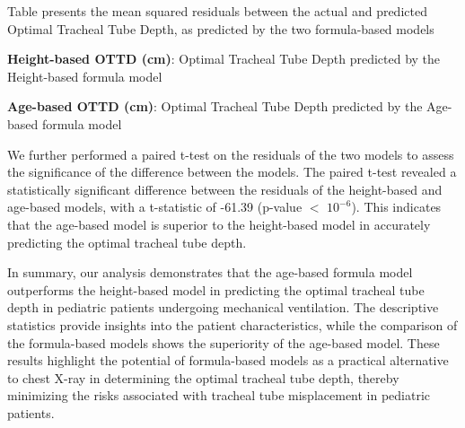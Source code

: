 \documentclass[11pt]{article}
\begin{document}
\begin{table}[h]
\caption{Comparison of actual OTTD measurements and predictions from the height and age models}
\label{table:comparison_ottd_models}
\begin{threeparttable}
\renewcommand{\TPTminimum}{\linewidth}
\begin{tablenotes}
\footnotesize
\item Table presents the mean squared residuals between the actual and predicted Optimal Tracheal Tube Depth, as predicted by the two formula-based models
\item \textbf{Height-based OTTD (cm)}: Optimal Tracheal Tube Depth predicted by the Height-based formula model
\item \textbf{Age-based OTTD (cm)}: Optimal Tracheal Tube Depth predicted by the Age-based formula model
\end{tablenotes}
\end{threeparttable}
\end{table}


We further performed a paired t-test on the residuals of the two models to assess the significance of the difference between the models. The paired t-test revealed a statistically significant difference between the residuals of the height-based and age-based models, with a t-statistic of -61.39 (p-value $<$ $10^{-6}$). This indicates that the age-based model is superior to the height-based model in accurately predicting the optimal tracheal tube depth.

In summary, our analysis demonstrates that the age-based formula model outperforms the height-based model in predicting the optimal tracheal tube depth in pediatric patients undergoing mechanical ventilation. The descriptive statistics provide insights into the patient characteristics, while the comparison of the formula-based models shows the superiority of the age-based model. These results highlight the potential of formula-based models as a practical alternative to chest X-ray in determining the optimal tracheal tube depth, thereby minimizing the risks associated with tracheal tube misplacement in pediatric patients.


\clearpage
\appendix
\end{document}
